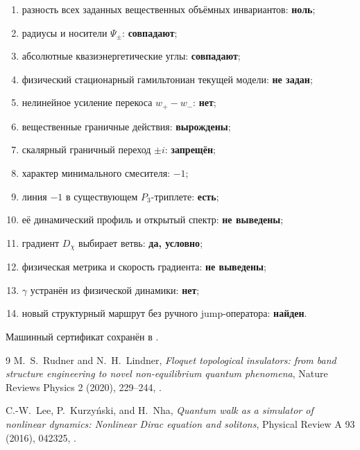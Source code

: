 \begin{protocol}
\begin{enumerate}
 \item разность всех заданных вещественных объёмных инвариантов:
 \textbf{ноль};
 \item радиусы и носители $\Psi_\pm$: \textbf{совпадают};
 \item абсолютные квазиэнергетические углы: \textbf{совпадают};
 \item физический стационарный гамильтониан текущей модели:
 \textbf{не задан};
 \item нелинейное усиление перекоса $w_+-w_-$: \textbf{нет};
 \item вещественные граничные действия: \textbf{вырождены};
 \item скалярный граничный переход $\pm i$: \textbf{запрещён};
 \item характер минимального смесителя: \textbf{$-1$};
 \item линия $-1$ в существующем $P_3$-триплете: \textbf{есть};
 \item её динамический профиль и открытый спектр: \textbf{не выведены};
 \item градиент $D_\chi$ выбирает ветвь: \textbf{да, условно};
 \item физическая метрика и скорость градиента: \textbf{не выведены};
 \item $\gamma$ устранён из физической динамики: \textbf{нет};
 \item новый структурный маршрут без ручного jump-оператора:
 \textbf{найден}.
\end{enumerate}
\end{protocol}

Машинный сертификат сохранён в
.

\begin{thebibliography}{9}
M.~S.~Rudner and N.~H.~Lindner,
\emph{Floquet topological insulators: from band structure engineering to novel non-equilibrium quantum phenomena},
Nature Reviews Physics 2 (2020), 229--244,
.

C.-W.~Lee, P.~Kurzyński, and H.~Nha,
\emph{Quantum walk as a simulator of nonlinear dynamics: Nonlinear Dirac equation and solitons},
Physical Review A 93 (2016), 042325,
.
\end{thebibliography}